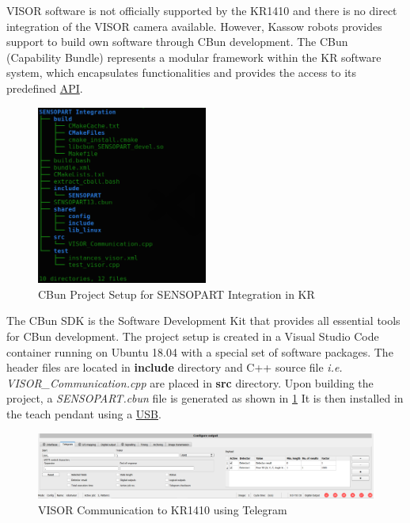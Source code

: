VISOR software is not officially supported by the KR1410 and there is no direct integration of the VISOR camera available.
However, Kassow robots provides support to build own software through CBun development.
The CBun (Capability Bundle) represents a modular framework within the KR software system,
which encapsulates functionalities and provides the
access to its predefined \hyperref[acro:API]{API}.


\begin{figure}[h]
    \centering
    \includegraphics[width=0.5\textwidth]{figures/sensopart-development.png}
    \caption{CBun Project Setup for SENSOPART Integration in KR}
    \label{fig:sensopart-development}
\end{figure}


The CBun SDK is the Software Development Kit that provides all essential tools
for CBun development. The project setup is created in a Visual Studio Code container
running on Ubuntu 18.04 with a special set of software packages. \cite{Cbun}
The header files are located in \textbf{include} directory and C++ source file \textit{i.e.}     \textit{VISOR\_Communication.cpp}
are placed in \textbf{src} directory.
Upon building the project, a \textit{SENSOPART.cbun} file is generated as shown in \ref{fig:sensopart-development}
It is then installed in the teach pendant using a \hyperref[acro:USB]{USB}.

\begin{figure}[h]
    \centering
    \includegraphics[width=1\textwidth]{figures/telegram-output.png}
    \caption{VISOR Communication to KR1410 using Telegram}
    \label{fig:visor-communication}
\end{figure}

